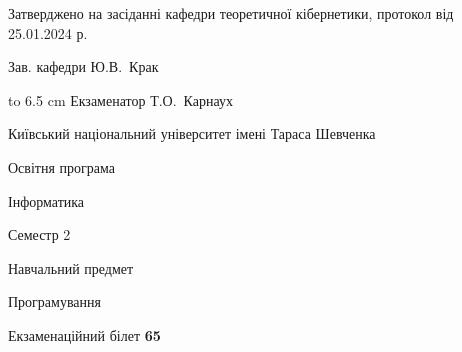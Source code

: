 \documentclass[12pt, ukrainian]{article}
\begin{document}
{\smallskip\smallskip \begin {scriptsize} Затверджено на засіданні кафедри теоретичної кібернетики, протокол   від   25.01.2024 р.\par\smallskip\smallskip\smallskip\smallskip
{\parbox {6.5 cm} {Зав. кафедри \dotfill Ю.В.~Крак}}\hspace {0.7cm} {\hbox to 6.5 cm { Екзаменатор \dotfill Т.О.~Карнаух}} \end{scriptsize}}
\newpage
{{\begin {scriptsize}\par
{ \center  Київський національний університет імені Тараса Шевченка \par}
{\parbox {5 cm}{Освітня програма \hfill}{\parbox {7 cm}{Інформатика\hfill}}\parbox {6 cm}{\hfill Семестр 2}}\par
{\parbox {5 cm} {Навчальний предмет \hfill}\parbox {7 cm}{Програмування \hfill}\parbox {6cm}{\hfill}\par}\vspace{-15pt} \end{scriptsize}}{\center Екзаменаційний білет \No \textbf { 65 }\par}}
\end{document}
